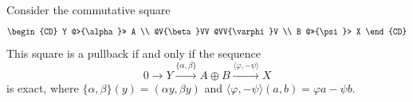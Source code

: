 Consider the commutative square
$$
\begin{CD}
Y @>{\alpha}>> A \\
@V{\beta}VV @VV{\varphi}V \\
B @>>{\psi}> X
\end{CD}
$$
This square is a pullback if and only if the sequence
$$
0 \longrightarrow Y \xrightarrow{\{\alpha,\beta\}} A \oplus B \xrightarrow{\langle \varphi, -\psi \rangle} X
$$
is exact, where $\{\alpha,\beta\}(y) = (\alpha y, \beta y)$ and $\langle \varphi, -\psi \rangle(a,b) = \varphi a - \psi b$.
